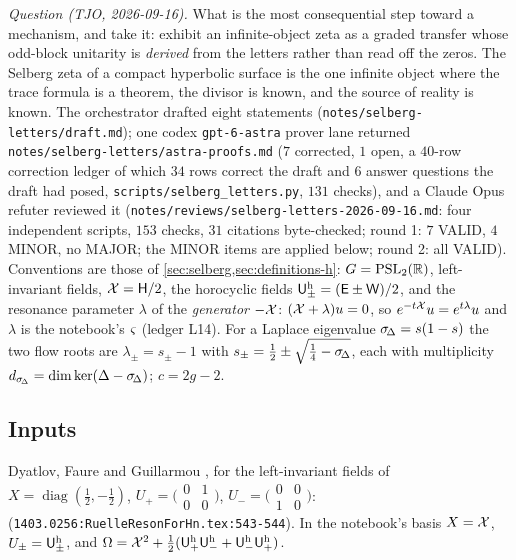 \emph{Question (TJO, 2026-09-16).} What is the most consequential step toward a mechanism, and
take it: exhibit an infinite-object zeta as a graded transfer whose odd-block unitarity is
\emph{derived} from the letters rather than read off the zeros. The Selberg zeta of a compact
hyperbolic surface is the one infinite object where the trace formula is a theorem, the divisor is
known, and the source of reality is known. The orchestrator drafted eight statements
(\texttt{notes/selberg-letters/draft.md}); one codex \texttt{gpt-6-astra} prover lane returned
\texttt{notes/selberg-letters/astra-proofs.md} ($7$ corrected, $1$ open, a $40$-row correction
ledger of which $34$ rows correct the draft and $6$ answer questions the draft had posed,
\texttt{scripts/selberg\_letters.py}, $131$ checks), and a Claude Opus refuter reviewed it
(\texttt{notes/reviews/selberg-letters-2026-09-16.md}: four independent scripts, $153$ checks,
$31$ citations byte-checked; round 1: $7$ VALID, $4$ MINOR, no MAJOR; the MINOR items are applied
below; round 2: all VALID). Conventions are those of
\cref{sec:selberg,sec:definitions-h}: $G = \mathrm{PSL}_2(\mathbb R)$, left-invariant fields, $\mathcal X =
\mathsf H/2$, the horocyclic fields ${\mathsf U^{\mathrm h}_{\pm}} = (\mathsf E\pm\mathsf W)/2$, and the resonance parameter
$\lambda$ of the \emph{generator $-\mathcal X$}: $(\mathcal X+\lambda)u = 0$, so $e^{-t\mathcal X}u =
e^{t\lambda}u$ and $\lambda$ is the notebook's $\varsigma$ (ledger L14). For a Laplace eigenvalue
$\sigma_{\!\Delta} = s(1-s)$ the two flow roots are $\lambda_\pm = s_\pm-1$ with $s_\pm = \tfrac12\pm
\sqrt{\tfrac14-\sigma_{\!\Delta}}$, each with multiplicity $d_{\sigma_{\!\Delta}} = \dim\ker(\Delta-\sigma_{\!\Delta})$; $c = 2g-2$.

\subsection{Inputs}

\begin{citedfact}
\label{cit:dfg-horocyclic}
Dyatlov, Faure and Guillarmou \cite{dyatlov2015power}, for the left-invariant fields of
$X = \operatorname{diag}(\tfrac12,-\tfrac12)$, $U_+ = \bigl(\begin{smallmatrix}0&1\\0&0\end{smallmatrix}\bigr)$,
$U_- = \bigl(\begin{smallmatrix}0&0\\1&0\end{smallmatrix}\bigr)$:
\texttt{}
(\texttt{1403.0256:RuelleResonForHn.tex:543-544}). In the notebook's basis $X = \mathcal X$,
$U_\pm = {\mathsf U^{\mathrm h}_{\pm}}$, and $\Omega = \mathcal X^2+\tfrac12({\mathsf U^{\mathrm h}_{+}}{\mathsf U^{\mathrm h}_{-}}+{\mathsf U^{\mathrm h}_{-}}{\mathsf U^{\mathrm h}_{+}})$.
\end{citedfact}

